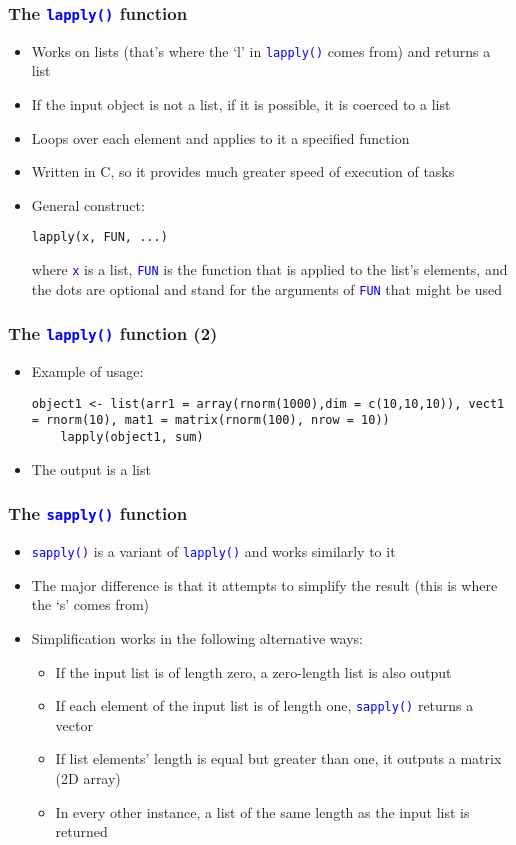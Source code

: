 \documentclass[10pt]{beamer}
\newcommand{\cc}[1]{\texttt{\textcolor{blue}{#1}}}
\theoremstyle{definition}
\begin{document}
\begin{frame}[fragile]
\frametitle{The \cc{lapply()} function}
\begin{itemize}
	\item Works on lists (that's where the `l' in \cc{lapply()} comes from) and returns a list
	\item If the input object is not a list, if it is possible, it is coerced to a list
	\item Loops over each element and applies to it a specified function
	\item Written in C, so it provides much greater speed of execution of tasks
	\item General construct:
	\begin{lstlisting}[style = rstyle, breaklines]
	lapply(x, FUN, ...)
	\end{lstlisting}
	where \cc{x} is a list, \cc{FUN} is the function that is applied to the list's elements, and the dots are optional and stand for the  arguments of \cc{FUN} that might be used
\end{itemize}
\end{frame}

\begin{frame}[fragile]
\frametitle{The \cc{lapply()} function (2)}
\begin{itemize}
	\item Example of usage:
	\begin{lstlisting}[style = rstyle, breaklines]
	object1 <- list(arr1 = array(rnorm(1000),dim = c(10,10,10)), vect1 = rnorm(10), mat1 = matrix(rnorm(100), nrow = 10))
	lapply(object1, sum)
	\end{lstlisting}
	\item The output is a list
\end{itemize}
\end{frame}

\begin{frame}[fragile]
\frametitle{The \cc{sapply()} function}
\begin{itemize}
	\item \cc{sapply()} is a variant of \cc{lapply()} and works similarly to it
	\item The major difference is that it attempts to simplify the result (this is where the `s' comes from)
	\item Simplification works in the following alternative ways:
	\begin{itemize}
		\item If the input list is of length zero, a zero-length list is also output
		\item If each element of the input list is of length one, \cc{sapply()} returns a vector 
		\item If list elements' length is equal but greater than one, it outputs a matrix (2D array)
		\item In every other instance, a list of the same length as the input list is returned
	\end{itemize}
\end{itemize}
\end{frame}
\end{document}
